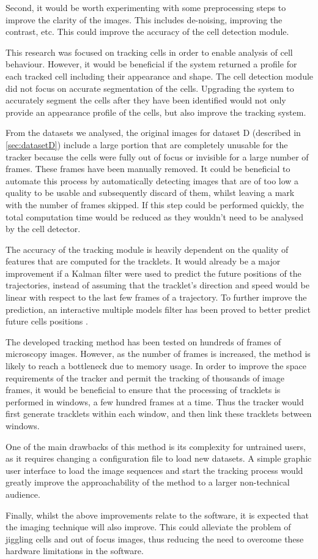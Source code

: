 Second, it would be worth experimenting with some preprocessing steps to improve the clarity of the images. This includes de-noising, improving the contrast, etc. This could improve the accuracy of the cell detection module.

This research was focused on tracking cells in order to enable analysis of cell behaviour. However, it would be beneficial if the system returned a profile for each tracked cell including their appearance and shape. The cell detection module did not focus on accurate segmentation of the cells. Upgrading the system to accurately segment the cells after they have been identified would not only provide an appearance profile of the cells, but also improve the tracking system. 

From the datasets we analysed, the original images for dataset D (described in \cref{sec:datasetD}) include a large portion that are completely unusable for the tracker because the cells were fully out of focus or invisible for a large number of frames. These frames have been manually removed. It could be beneficial to automate this process by automatically detecting images that are of too low a quality to be usable and subsequently discard of them, whilst leaving a mark with the number of frames skipped. If this step could be performed quickly, the total computation time would be reduced as they wouldn't need to be analysed by the cell detector.

The accuracy of the tracking module is heavily dependent on the quality of features that are computed for the tracklets. It would already be a major improvement if a Kalman filter were used to predict the future positions of the trajectories, instead of assuming that the tracklet's direction and speed would be linear with respect to the last few frames of a trajectory. To further improve the prediction, an interactive multiple models filter has been proved to better predict future cells positions \cite{li08}.

The developed tracking method has been tested on hundreds of frames of microscopy images. However, as the number of frames is increased, the method is likely to reach a bottleneck due to memory usage. In order to improve the space requirements of the tracker and permit the tracking of thousands of image frames, it would be beneficial to ensure that the processing of tracklets is performed in windows, a few hundred frames at a time. Thus the tracker would first generate tracklets within each window, and then link these tracklets between windows. 

One of the main drawbacks of this method is its complexity for untrained users, as it requires changing a configuration file to load new datasets. A simple graphic user interface to load the image sequences and start the tracking process would greatly improve the approachability of the method to a larger non-technical audience.

Finally, whilst the above improvements relate to the software, it is expected that the imaging technique will also improve. This could alleviate the problem of jiggling cells and out of focus images, thus reducing the need to overcome these hardware limitations in the software.